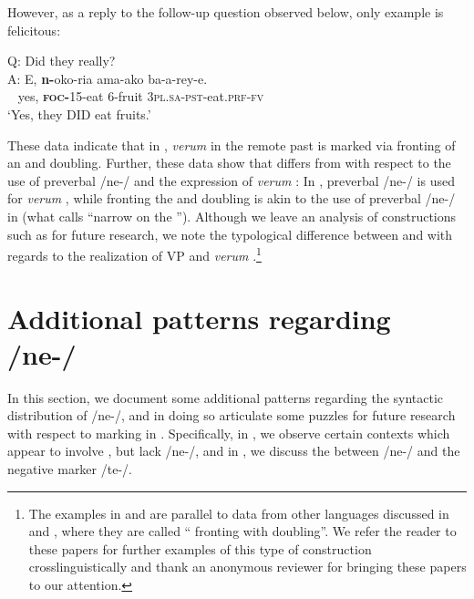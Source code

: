 \documentclass[output=paper,modfonts]{langscibook}
\begin{document}
However, as a reply to the follow-up question observed below, only example  is felicitous:

\ea\label{ex:landmann:43}
Q: Did they really?\\
\gll A: E, \textbf{n-}oko-ria ama-ako ba-a-rey-e.\\
     ~ yes, \textsc{\textbf{foc-}}15-eat 6-fruit \textsc{3pl}.\textsc{sa}-\textsc{pst}-eat.\textsc{prf}-\textsc{fv}\\
\glt ‘Yes, they DID eat fruits.’
\z

 
These data indicate that in , \textit{verum}  in the remote past is marked via fronting of an   and  doubling. Further, these data show that  differs from  with respect to the use of preverbal /ne-/ and the expression of \textit{verum} : In , preverbal /ne-/ is used for \textit{verum} , while fronting the   and  doubling is akin to the use of preverbal /ne-/ in  (what \citealt{Schwarz2007} calls “narrow  on the ”). Although we leave an analysis of constructions such as  for future research, we note the typological difference between  and  with regards to the realization of VP and \textit{verum} .\footnote{The examples in  and  are parallel to data from other languages discussed in \citet{Aboh2006} and  \citet{AbohDyakanova2009}, where they are called “ fronting with doubling”. We refer the reader to these papers for further examples of this type of construction crosslinguistically and thank an anonymous reviewer for bringing these papers to our attention.}


 
\section{Additional patterns regarding /ne-/}\label{sec:landman:6}


In this section, we document some additional patterns regarding the syntactic distribution of /ne-/, and in doing so articulate some puzzles for future research with respect to  marking in . Specifically, in , we observe certain contexts which appear to involve , but lack /ne-/, and in , we discuss the  between /ne-/ and the negative marker /te-/.
\end{document}
